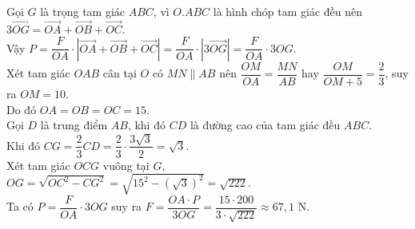 \begin{bt}
{		Gọi $G$ là trọng tam giác $ABC$, vì $O.ABC$ là hình chóp tam giác đều nên $3\overrightarrow{OG}=\overrightarrow{OA}+\overrightarrow{OB}+\overrightarrow{OC}$.\\
		Vậy $P=\dfrac{F}{OA}\cdot\left|\overrightarrow{OA}+\overrightarrow{OB}+\overrightarrow{OC}\right|=\dfrac{F}{OA}\cdot \left|3\overrightarrow{OG}\right|=\dfrac{F}{OA}\cdot 3OG$.\\
		Xét tam giác $OAB$ cân tại $O$ có $MN\parallel AB$ nên $\dfrac{OM}{OA}=\dfrac{MN}{AB}$ hay $\dfrac{OM}{OM+5}=\dfrac{2}{3}$, suy ra $OM=10$.\\
		Do đó $OA=OB=OC=15$.\\
		Gọi $D$ là trung điểm $AB$, khi đó $CD$ là đường cao của tam giác đều $ABC$.\\
		Khi đó $CG=\dfrac{2}{3}CD=\dfrac{2}{3}\cdot \dfrac{3\sqrt{3}}{2}=\sqrt{3}$. \\
		Xét tam giác $OCG$ vuông tại $G$, $OG=\sqrt{OC^2-CG^2}=\sqrt{15^2-\left(\sqrt{3}\right)^2}=\sqrt{222}$.\\
		Ta có $P=\dfrac{F}{OA}\cdot 3OG$ suy ra $F=\dfrac{OA\cdot P}{3OG}=\dfrac{15\cdot 200}{3\cdot \sqrt{222}}\approx 67{,}1$ N.	
	}
\end{bt}

